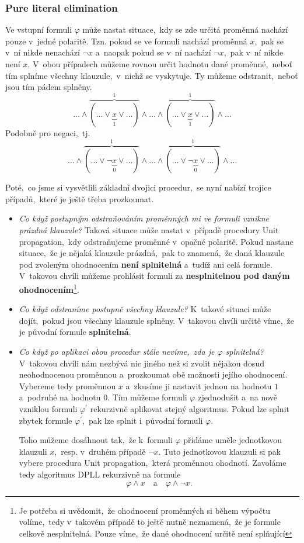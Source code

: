 \subsubsection*{Pure literal elimination}

Ve vstupní formuli $\varphi$ může nastat situace,~kdy se zde určitá proměnná nachází pouze v~jedné polaritě. Tzn. pokud se ve formuli nachází proměnná $x$,~pak se v~ní nikde nenachází $\neg x$ a~naopak pokud se v~ní nachází $\neg x$,~pak v~ní nikde není $x$. V~obou případech můžeme rovnou určit hodnotu dané proměnné,~neboť tím splníme všechny klauzule,~v~nichž se vyskytuje. Ty můžeme odstranit,~neboť jsou tím pádem splněny.
\[\dots\land\overbrace{(\dots\lor \underbrace{x}_{1}\lor\dots)}^{1}\land\dots\land\overbrace{(\dots\lor \underbrace{x}_{1}\lor\dots)}^{1}\land\dots\]
Podobně pro negaci,~tj.
\[\dots\land\overbrace{(\dots\lor \neg\underbrace{x}_{0}\lor\dots)}^{1}\land\dots\land\overbrace{(\dots\lor \neg\underbrace{x}_{0}\lor\dots)}^{1}\land\dots\]

Poté,~co jsme si vysvětlili základní dvojici procedur,~se nyní nabízí trojice případů,~které je ještě třeba prozkoumat.
\begin{itemize}
    \item \emph{Co když postupným odstraňováním proměnných mi ve formuli vznikne prázdná klauzule?} Taková situace může nastat v~případě procedury Unit propagation,~kdy odstraňujeme proměnné v~opačné polaritě. Pokud nastane situace,~že je nějaká klauzule prázdná,~pak to znamená,~že daná klauzule pod zvoleným ohodnocením \textbf{není splnitelná} a~tudíž ani celá formule. V~takovou chvíli můžeme prohlásit formuli za \textbf{nesplnitelnou pod daným ohodnocením}\footnote{Je potřeba si uvědomit,~že ohodnocení proměnných si během výpočtu volíme,~tedy v~takovém případě to ještě nutně neznamená,~že je formule celkově nesplnitelná. Pouze víme,~že dané ohodnocení určitě není splňující}.
    \item \emph{Co když odstraníme postupně všechny klauzule?} K~takové situaci může dojít,~pokud jsou všechny klauzule splněny. V~takovou chvíli určitě víme,~že je původní formule \textbf{splnitelná}.
    \item \emph{Co když po aplikaci obou procedur stále nevíme,~zda je $\varphi$ splnitelná?} V~takovou chvíli nám nezbývá nic jiného než si zvolit nějakou dosud neohodnocenou proměnnou a~prozkoumat obě možnosti jejího ohodnocení. Vybereme tedy proměnnou $x$ a~zkusíme ji nastavit jednou na hodnotu $1$ a~podruhé na hodnotu $0$. Tím můžeme formuli $\varphi$ zjednodušit a~na nově vzniklou formuli $\varphi^\prime$ rekurzivně aplikovat stejný algoritmus. Pokud lze splnit zbytek formule $\varphi^\prime$,~pak lze splnit i~původní formuli $\varphi$.
    
    Toho můžeme dosáhnout tak,~že k~formuli $\varphi$ přidáme uměle jednotkovou klauzuli $x$,~resp. v~druhém případě $\neg x$. Tuto jednotkovou klauzuli si pak vybere procedura Unit propagation,~která proměnnou ohodnotí. Zavoláme tedy algoritmus DPLL rekurzivně na formule
    \[\varphi\land x\quad\text{a}\quad\varphi\land\neg x.\]
\end{itemize}

